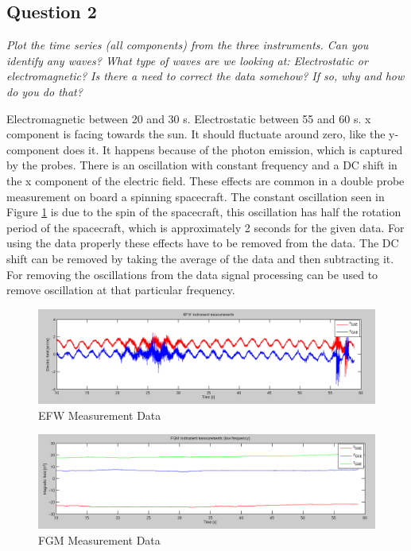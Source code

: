 \documentclass{article}
\begin{document}
\subsection{Question 2}
\textit{Plot the time series (all components) from the three instruments. Can you identify any waves? What type of waves are we looking at: Electrostatic or electromagnetic? Is there a need to correct the data somehow? If so, why and how do you do that?}

Electromagnetic between 20 and 30 s. Electrostatic between 55 and 60 s. x component is facing towards the sun. It should fluctuate around zero, like the y-component does it. It happens because of the photon emission, which is captured by the probes. There is an oscillation with constant frequency and a DC shift in the x component of the electric field. These effects are common in a double probe measurement on board a spinning spacecraft. The constant oscillation seen in Figure \ref{fig:EFW} is due to the spin of the spacecraft, this oscillation has half the rotation period of the spacecraft, which is approximately 2 seconds for the given data. For using the data properly these effects have to be removed from the data. The DC shift can be removed by taking the average of the data and then subtracting it. For removing the oscillations from the data signal processing can be used to remove oscillation at that particular frequency.

\begin{figure}[htb!]
\centering
\includegraphics[width=\textwidth]{Figures/EFW_measurement.png}
\caption{EFW Measurement Data}
\label{fig:EFW}
\end{figure}

\begin{figure}[htb!]
\centering
\includegraphics[width=\textwidth]{Figures/FGM_measurement.png}
\caption{FGM Measurement Data}
\label{fig:FGM}
\end{figure}
\end{document}
